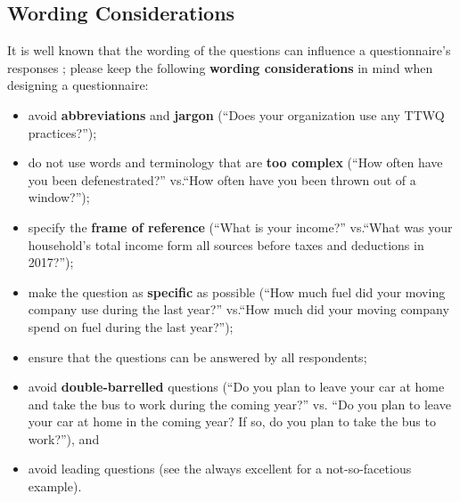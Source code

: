 \subsection{Wording Considerations} It is well known that the wording of the questions can influence a questionnaire's responses \cite{DC_G}; please keep the following \textbf{wording considerations} in mind when designing a questionnaire:   
\begin{itemize}[noitemsep] 
\item avoid \textbf{abbreviations} and \textbf{jargon} (``Does your organization use any TTWQ practices?'');
\item do not use words and terminology that are \textbf{too complex} (``How often have you been defenestrated?'' vs.\@ ``How often have you been thrown out of a window?'');
\item specify the \textbf{frame of reference} (``What is your income?'' vs.\@ ``What was your household's total income form all sources before taxes and deductions in 2017?'');
\item make the question as \textbf{specific} as possible (``How much fuel did your moving company use during the last year?'' vs.\@ ``How much did your moving company  spend on fuel during the last year?'');
\item ensure that the questions can be answered by all respondents;
\item avoid \textbf{double-barrelled} questions (``Do you plan to leave your car at home and take the bus to work during the coming year?'' vs. ``Do you plan to leave your car at home in the coming year? If so, do you plan to take the bus to work?''), and 
\item avoid leading questions (see the always excellent \cite{DC_YPM} for a not-so-facetious example).
\end{itemize}
